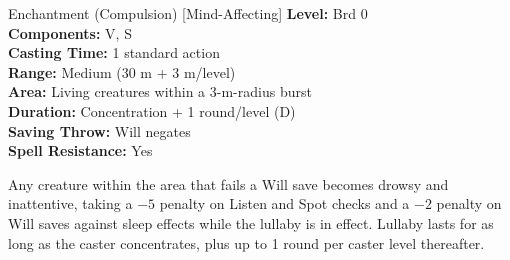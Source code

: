 {Enchantment (Compulsion) [Mind-Affecting]}
{
	\textbf{Level:}
	Brd 0\\
	\textbf{Components:}
	V, S\\
	\textbf{Casting Time:}
	1 standard action\\
	\textbf{Range:}
	Medium (30 m + 3 m/level)\\
	\textbf{Area:}
	Living creatures within a 3-m-radius burst\\
	\textbf{Duration:}
	Concentration + 1 round/level (D)\\
	\textbf{Saving Throw:}
	Will negates\\
	\textbf{Spell Resistance:}
	Yes\\
}
{
	Any creature within the area that fails a Will save becomes drowsy and inattentive, taking a $-5$ penalty on Listen and Spot checks and a $-2$ penalty on Will saves against sleep effects while the lullaby is in effect. Lullaby lasts for as long as the caster concentrates, plus up to 1 round per caster level thereafter.

}
